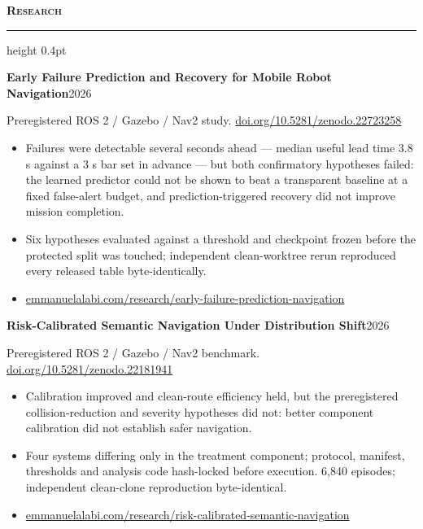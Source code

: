 \documentclass[10pt,a4paper]{article}
\newcommand{\cvsection}[1]{%
  \vspace{0.95em}%
  {\normalsize\bfseries\scshape #1}\par
  \vspace{0.25em}%
  \hrule height 0.4pt
  \vspace{0.6em}%
}
\newcommand{\cventry}[2]{%
  \textbf{#1}\hfill{\small #2}\par\vspace{0.15em}%
}
\newenvironment{cvitems}{%
  \begin{itemize}%
    \setlength{\itemsep}{0.12em}%
    \setlength{\parskip}{0pt}%
    \setlength{\parsep}{0pt}%
    \setlength{\topsep}{0.25em}%
    \setlength{\partopsep}{0pt}%
}{%
  \end{itemize}%
  \vspace{0.25em}%
}
\begin{document}
\cvsection{Research}

\cventry{Early Failure Prediction and Recovery for Mobile Robot Navigation}{2026}
{\small Preregistered ROS 2 / Gazebo / Nav2 study.
\href{https://doi.org/10.5281/zenodo.22723258}{doi.org/10.5281/zenodo.22723258}}
\begin{cvitems}
  \item Failures were detectable several seconds ahead --- median useful lead time
        3.8 s against a 3 s bar set in advance --- but both confirmatory
        hypotheses failed: the learned predictor could not be shown to beat a
        transparent baseline at a fixed false-alert budget, and prediction-triggered
        recovery did not improve mission completion.
  \item Six hypotheses evaluated against a threshold and checkpoint frozen before
        the protected split was touched; independent clean-worktree rerun
        reproduced every released table byte-identically.
  \item \href{https://www.emmanuelalabi.com/research/early-failure-prediction-navigation}{emmanuelalabi.com/research/early-failure-prediction-navigation}
\end{cvitems}

\cventry{Risk-Calibrated Semantic Navigation Under Distribution Shift}{2026}
{\small Preregistered ROS 2 / Gazebo / Nav2 benchmark.
\href{https://doi.org/10.5281/zenodo.22181941}{doi.org/10.5281/zenodo.22181941}}
\begin{cvitems}
  \item Calibration improved and clean-route efficiency held, but the
        preregistered collision-reduction and severity hypotheses did not:
        better component calibration did not establish safer navigation.
  \item Four systems differing only in the treatment component; protocol,
        manifest, thresholds and analysis code hash-locked before execution.
        6,840 episodes; independent clean-clone reproduction byte-identical.
  \item \href{https://www.emmanuelalabi.com/research/risk-calibrated-semantic-navigation}{emmanuelalabi.com/research/risk-calibrated-semantic-navigation}
\end{cvitems}
\end{document}
